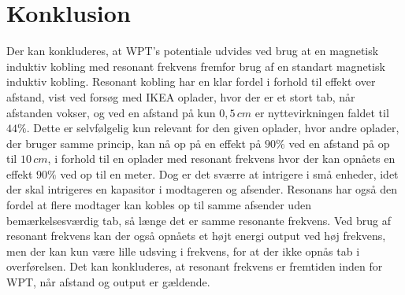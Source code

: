 \chapter{Konklusion}
Der kan konkluderes, at WPT's potentiale udvides ved brug at en magnetisk induktiv kobling med resonant frekvens fremfor brug af en standart magnetisk induktiv kobling. Resonant kobling har en klar fordel i forhold til effekt over afstand, vist ved forsøg med IKEA oplader, hvor der er et stort tab, når afstanden vokser, og ved en afstand på kun $0,5 \, cm$ er nyttevirkningen faldet til $44\%$. Dette er selvfølgelig kun relevant for den given oplader, hvor andre oplader, der bruger samme princip, kan nå op på en effekt på $90\%$ ved en afstand på op til $10 \, cm$, i forhold til en oplader med resonant frekvens hvor der kan opnåets en effekt $90\%$ ved op til en meter. Dog er det sværre at intrigere i små enheder, idet der skal intrigeres en kapasitor i modtageren og afsender. Resonans har også den fordel at flere modtager kan kobles op til samme afsender uden bemærkelsesværdig tab, så længe det er samme resonante frekvens. Ved brug af resonant frekvens kan der også opnåets et højt energi output ved høj frekvens, men der kan kun være lille udsving i frekvens, for at der ikke opnås tab i overførelsen. Det kan konkluderes, at resonant frekvens er fremtiden inden for WPT, når afstand og output er gældende.